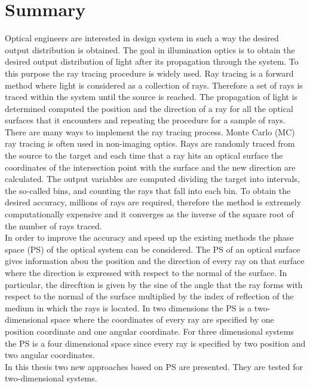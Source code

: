 \chapter*{Summary}
Optical engineers are interested in design system in such a way the desired output distribution is obtained.
The goal in illumination optics is to obtain the desired output distribution of light after its propagation through the system. To this purpose the ray tracing procedure is widely used. Ray tracing is a forward method where light is considered as a collection of rays. Therefore a set of rays is traced within the system until the source is reached. The propagation of light is determined computed the position and the direction of a ray for all the optical surfaces that it encounters and repeating the procedure for a sample of rays. There are many ways to implement the ray tracing process. Monte Carlo (MC) ray tracing is often used in non-imaging optics. Rays are randomly traced from the source to the target and each time that a ray hits an optical surface the coordinates of the intersection point with the surface and the new direction are calculated. The output variables are computed dividing the target into intervals, the so-called bins, and counting the rays that fall into each bin. To obtain the desired accuracy, millions of rays are required, therefore the method is extremely computationally expensive and it converges as the inverse of the square root of the number of rays traced. %
\\ \indent In order to improve the accuracy and speed up the existing methods the phase space (PS) of the optical system can be considered. The PS of an optical surface gives information abou the position and the direction of every ray on that surface where the direction is expressed with respect to the normal of the surface. In particular, the direcftion is given by the sine of the angle that the ray forms with respect to the normal of the surface multiplied by the index of reflection of the medium in which the rays is located.
In two dimensions the PS is a two-dimensional space where the coordinates of every ray are specified by one position coordinate and one angular coordinate. 
For three dimensional systems the PS is a four dimensional space since every ray is specified by two position and two angular coordinates. 
\\ \indent
In this thesis two new approaches based on PS are presented. They are tested for two-dimensional systems. 
